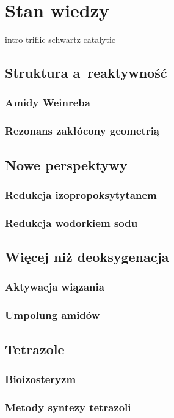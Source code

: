\chapter{Stan wiedzy}\label{chapter:literature}

{intro}
{triflic}
{schwartz}
{catalytic}

\section{Struktura a~reaktywność}\label{literature:structure}
\subsection{Amidy Weinreba}\label{literature:structure:weinreb}
\subsection{Rezonans zakłócony geometrią}\label{literature:structure:geometry}

\section{Nowe perspektywy}\label{literature:perspectives}
\subsection{Redukcja izopropoksytytanem}\label{literature:perspectives:titanium}
\subsection{Redukcja wodorkiem sodu}\label{literature:perspectives:sodium-hydride}

\section{Więcej niż deoksygenacja}\label{literature:other}
\subsection{Aktywacja wiązania }\label{literature:other:c-n}
\subsection{Umpolung amidów}\label{literature:other:umpolung}

\section{Tetrazole}\label{literature:tetrazole}
\subsection{Bioizosteryzm}\label{literature:tetrazole:bioisosterizm}
\subsection{Metody syntezy tetrazoli}\label{literature:tetrazole:synthesis}
